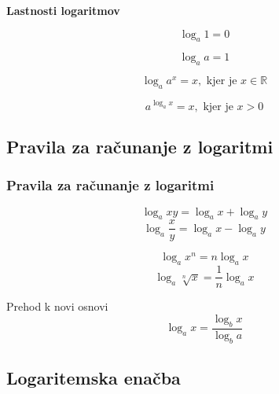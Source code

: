         \begin{frame}
            \large\textbf{Lastnosti logaritmov}
            ~\\
            \normalsize

            \begin{alertblock}{}
                $$\log_a1=0$$
            \end{alertblock}

            \begin{alertblock}{}
                $$\log_aa=1$$
            \end{alertblock}

            \begin{alertblock}{}
                $$\log_aa^x=x, \textrm{\ kjer je\ } x\in\mathbb{R}$$
            \end{alertblock}

            \begin{alertblock}{}
                $$a^{\log_ax}=x, \textrm{\ kjer je\ } x>0$$
            \end{alertblock}
        \end{frame}

    \subsection{Pravila za računanje z logaritmi}

        \begin{frame}
            \frametitle{Pravila za računanje z logaritmi}
        
            \begin{alertblock}{}
                $$\log_axy = \log_ax + \log_ay$$
                $$\log_a\frac{x}{y} = \log_ax - \log_ay$$
            \end{alertblock}

            \begin{alertblock}{}
                $$\log_ax^n = n\log_ax$$
                $$\log_a\sqrt[n]{x} = \frac{1}{n}\log_ax$$
            \end{alertblock}

            \begin{alertblock}{Prehod k novi osnovi}
                $$\log_ax = \frac{\log_bx}{\log_ba}$$
            \end{alertblock}


        \end{frame}

    \subsection{Logaritemska enačba}

